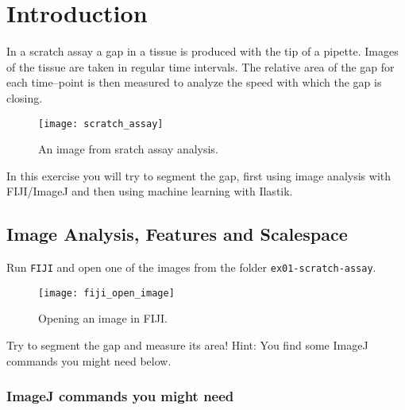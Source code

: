 \chapter{Introduction}

In a scratch assay a gap in a tissue is produced with the tip of a pipette. Images of the tissue are taken in regular time intervals. The relative area of the gap for each time--point is then measured to analyze the speed with which the gap is closing.  

\begin{figure}[!htb]
 \centering
 \texttt{[image: scratch\_assay]}
 \caption{An image from sratch assay analysis.}
 \label{figure:scratch-assay}
\end{figure}

In this exercise you will try to segment the gap, first using image analysis with FIJI/ImageJ and then using machine learning with Ilastik.

\section{Image Analysis, Features and Scalespace}

Run {\tt FIJI} and open one of the images from the folder {\tt ex01-scratch-assay}.

\begin{figure}[!htb]
 \centering
 \texttt{[image: fiji\_open\_image]}
 \caption{Opening an image in FIJI.}
 \label{figure:fiji-open-image}
\end{figure}

Try to segment the gap and measure its area! Hint: You find some ImageJ commands you might need below.

\subsection{ImageJ commands you might need}

